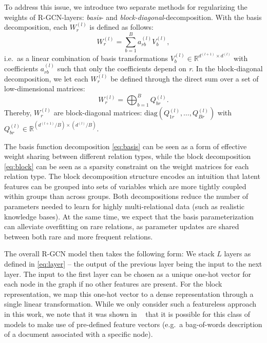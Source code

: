 \documentclass[letterpaper]{article} \usepackage{aaai18}  \usepackage{times}  \usepackage{helvet}  \usepackage{courier}  \usepackage{url}  \usepackage{graphicx}  \frenchspacing
\newcommand{\citet}[1]{\citeauthor{#1}~\shortcite{#1}}
\begin{document}
To address this issue, we introduce two separate methods for regularizing the weights of R-GCN-layers: \textit{basis}- and \textit{block-diagonal}-decomposition. With the basis decomposition, each $W_r^{(l)}$ is defined as follows:
\begin{equation}
\label{eq:basis}
W_r^{(l)} = \sum_{b=1}^B a_{rb}^{(l)} V_b^{(l)},
\end{equation}
i.e.~as a linear combination of basis transformations $V_b^{(l)}\in\mathbb{R}^{d^{(l+1)}\times d^{(l)}}$ with coefficients $a_{rb}^{(l)}$ such that only the coefficients depend on \textit{r}. In the block-diagonal decomposition, we let each $W_r^{(l)}$ be defined through the direct sum over a set of low-dimensional matrices:
\begin{equation}
\label{eq:block}
W_r^{(l)} = \bigoplus_{b=1}^B Q^{(l)}_{br}.
\end{equation}
Thereby, $W_r^{(l)}$ are block-diagonal matrices:
$\mathrm{diag}(Q^{(l)}_{1r}, \ldots, Q^{(l)}_{Br})$ with $Q^{(l)}_{br} \in \mathbb{R}^{(d^{(l+1)}/B)\times( d^{(l)}/B)}$.

The basis function decomposition \eqref{eq:basis} can be seen as a form of effective weight sharing between different relation types, while the block decomposition \eqref{eq:block} can be seen as a sparsity constraint on the weight matrices for each relation type. The block decomposition structure encodes an intuition that latent features can be grouped into sets of variables which are more tightly coupled within groups than across groups.
Both decompositions reduce the number of parameters needed to learn for highly multi-relational data (such as realistic knowledge bases). At the same time, we expect that the basis parameterization can alleviate overfitting on rare relations, as parameter updates are shared between both rare and more frequent relations.

The overall R-GCN model then takes the following form: We stack $L$ layers as defined in \eqref{eq:layer} -- the output of the previous layer being the input to the next layer. The input to the first layer can be chosen as a unique one-hot vector for each node in the graph if no other features are present. For the block representation, we map this one-hot vector to a dense representation through a single linear transformation. While we only consider such a featureless approach in this work, we note that it was shown in \citet{kipf2016semi} that it is possible for this class of models to make use of pre-defined feature vectors (e.g.~a bag-of-words description of a document associated with a specific node).
 
\end{document}

